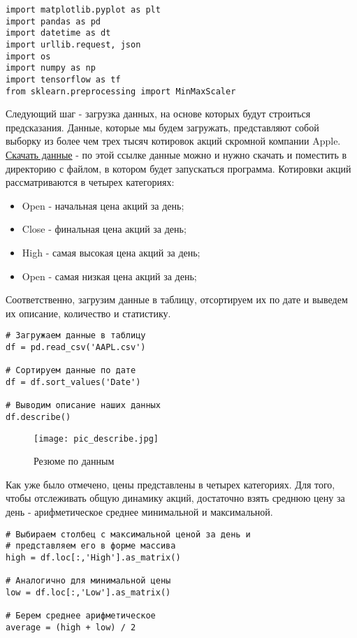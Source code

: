 \documentclass[12pt, a4paper]{article}
\begin{document}
\begin{verbatim}
import matplotlib.pyplot as plt
import pandas as pd
import datetime as dt
import urllib.request, json
import os
import numpy as np
import tensorflow as tf
from sklearn.preprocessing import MinMaxScaler
\end{verbatim}


Следующий шаг - загрузка данных, на основе которых будут строиться предсказания. Данные, которые мы будем загружать, представляют собой выборку из более чем трех тысяч котировок акций скромной компании Apple. \href{https://finance.yahoo.com/quote/AAPL/history?period1=1104534000&period2=1491775200&interval=1d&filter=history&frequency=1d&guccounter=1}{Скачать данные} - по этой ссылке данные можно и нужно скачать и поместить в директорию с файлом, в котором будет запускаться программа. Котировки акций рассматриваются в четырех категориях:

\begin{itemize}
	\item Open - начальная цена акций за день;
	\item Close - финальная цена акций за день;
  \item High - самая высокая цена акций за день;
	\item Open - самая низкая цена акций за день;
\end{itemize}

Соответственно, загрузим данные в таблицу, отсортируем их по дате и выведем их описание, количество и статистику.

\begin{verbatim}
# Загружаем данные в таблицу
df = pd.read_csv('AAPL.csv')

# Сортируем данные по дате
df = df.sort_values('Date')

# Выводим описание наших данных
df.describe()
\end{verbatim}

\begin{figure}[h]
    \centering
    \texttt{[image: pic\_describe.jpg]}
		\caption{Резюме по данным}
\end{figure}

Как уже было отмечено, цены представлены в четырех категориях. Для того, чтобы отслеживать общую динамику акций, достаточно взять среднюю цену за день - арифметическое среднее минимальной и максимальной.

\begin{verbatim}
# Выбираем столбец с максимальной ценой за день и
# представляем его в форме массива
high = df.loc[:,'High'].as_matrix()

# Аналогично для минимальной цены
low = df.loc[:,'Low'].as_matrix()

# Берем среднее арифметическое
average = (high + low) / 2
\end{verbatim}
\end{document}
